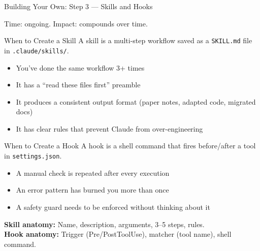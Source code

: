 \documentclass[aspectratio=169,11pt]{beamer}
\begin{document}
\begin{frame}[shrink=10]{Building Your Own: Step 3 --- Skills and Hooks}

\begin{exampleblock}{Time: ongoing. Impact: compounds over time.}
\end{exampleblock}

\smallskip

\begin{block}{When to Create a Skill}
\small A skill is a multi-step workflow saved as a \texttt{SKILL.md} file in \texttt{.claude/skills/}.
\begin{itemize}\footnotesize
  \item You've done the same workflow 3+ times
  \item It has a ``read these files first'' preamble
  \item It produces a consistent output format (paper notes, adapted code, migrated docs)
  \item It has clear rules that prevent Claude from over-engineering
\end{itemize}
\end{block}

\begin{block}{When to Create a Hook}
\small A hook is a shell command that fires before/after a tool in \texttt{settings.json}.
\begin{itemize}\footnotesize
  \item A manual check is repeated after every execution
  \item An error pattern has burned you more than once
  \item A safety guard needs to be enforced without thinking about it
\end{itemize}
\end{block}

\medskip

\small\textbf{Skill anatomy:} Name, description, arguments, 3--5 steps, rules.\\
\textbf{Hook anatomy:} Trigger (Pre/PostToolUse), matcher (tool name), shell command.

\end{frame}
\end{document}

